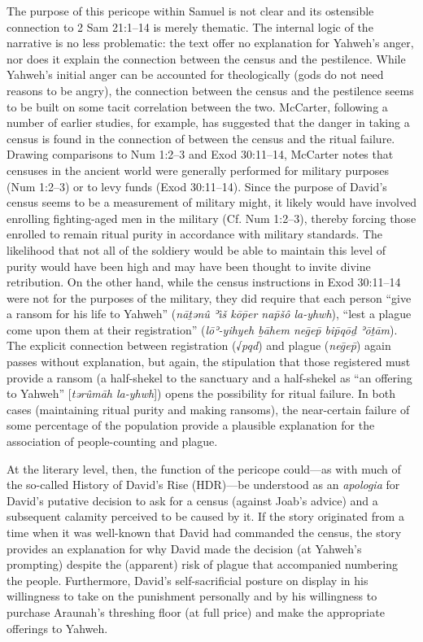 The purpose of this pericope within Samuel is not clear and its
ostensible connection to 2 Sam 21:1--14 is merely
thematic.\autocite[509]{mccarter1984} The internal logic of the
narrative is no less problematic: the text offer no explanation for
Yahweh's anger, nor does it explain the connection between the census
and the pestilence. While Yahweh's initial anger can be accounted for
theologically (gods do not need reasons to be angry), the connection
between the census and the pestilence seems to be built on some tacit
correlation between the two. McCarter, following a number of earlier
studies, for example, has suggested that the danger in taking a census
is found in the connection of between the census and the ritual failure.
Drawing comparisons to Num 1:2--3 and Exod 30:11--14, McCarter notes
that censuses in the ancient world were generally performed for military
purposes (Num 1:2--3) or to levy funds (Exod 30:11--14). Since the
purpose of David's census seems to be a measurement of military might,
it likely would have involved enrolling fighting-aged men in the
military (Cf. Num 1:2--3), thereby forcing those enrolled to remain
ritual purity in accordance with military standards. The likelihood that
not all of the soldiery would be able to maintain this level of purity
would have been high and may have been thought to invite divine
retribution. On the other hand, while the census instructions in Exod
30:11--14 were not for the purposes of the military, they did require
that each person ``give a ransom for his life to Yahweh'' (\emph{nāṯənû
ʾı̂š kōp̄er nap̄šô la-yhwh}), ``lest a plague come upon them at their
registration'' (\emph{lōʾ-yihyeh ḇāhem neḡep̄ bip̄qōḏ ʾōṯām}). The
explicit connection between registration (√\emph{pqd}) and plague
(\emph{neḡep̄}) again passes without explanation, but again, the
stipulation that those registered must provide a ransom (a half-shekel
to the sanctuary and a half-shekel as ``an offering to Yahweh''
{[}\emph{tərûmāh la-yhwh}{]}) opens the possibility for ritual failure.
In both cases (maintaining ritual purity and making ransoms), the
near-certain failure of some percentage of the population provide a
plausible explanation for the association of people-counting and plague.

At the literary level, then, the function of the pericope could---as
with much of the so-called History of David's Rise (HDR)---be understood
as an \emph{apologia} for David's putative decision to ask for a census
(against Joab's advice) and a subsequent calamity perceived to be caused
by it. If the story originated from a time when it was well-known that
David had commanded the census, the story provides an explanation for
why David made the decision (at Yahweh's prompting) despite the
(apparent) risk of plague that accompanied numbering the
people.\autocite[518]{mccarter1984} Furthermore, David's
self-sacrificial posture on display in his willingness to take on the
punishment personally and by his willingness to purchase Araunah's
threshing floor (at full price) and make the appropriate offerings to
Yahweh.

